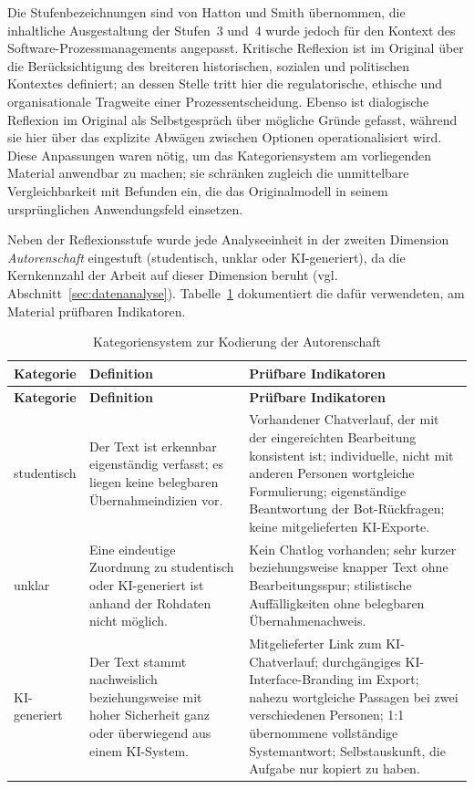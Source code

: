 Die Stufenbezeichnungen sind von Hatton und Smith \cite{hattonSmithReflectionTeacherEducation1995}
übernommen, die inhaltliche Ausgestaltung der Stufen~3 und~4 wurde jedoch für den Kontext des
Software-Prozessmanagements angepasst. Kritische Reflexion ist im Original über die Berücksichtigung
des breiteren historischen, sozialen und politischen Kontextes definiert; an dessen Stelle tritt hier
die regulatorische, ethische und organisationale Tragweite einer Prozessentscheidung. Ebenso ist
dialogische Reflexion im Original als Selbstgespräch über mögliche Gründe gefasst, während sie hier
über das explizite Abwägen zwischen Optionen operationalisiert wird. Diese Anpassungen waren nötig,
um das Kategoriensystem am vorliegenden Material anwendbar zu machen; sie schränken zugleich die
unmittelbare Vergleichbarkeit mit Befunden ein, die das Originalmodell in seinem ursprünglichen
Anwendungsfeld einsetzen.

Neben der Reflexionsstufe wurde jede Analyseeinheit in der zweiten Dimension \emph{Autorenschaft}
eingestuft (studentisch, unklar oder KI-generiert), da die Kernkennzahl der Arbeit auf dieser
Dimension beruht (vgl. Abschnitt~\ref{sec:datenanalyse}). Tabelle~\ref{tab:autorenschaft}
dokumentiert die dafür verwendeten, am Material prüfbaren Indikatoren.

\begingroup
\setlength{\tabcolsep}{4pt}
\begin{longtable}{p{2.6cm} p{5.2cm} p{5.2cm}}
	\caption{Kategoriensystem zur Kodierung der Autorenschaft}
	\label{tab:autorenschaft} \\
	\toprule
	\textbf{Kategorie} & \textbf{Definition} & \textbf{Prüfbare Indikatoren} \\
	\midrule
	\endfirsthead
	\toprule
	\textbf{Kategorie} & \textbf{Definition} & \textbf{Prüfbare Indikatoren} \\
	\midrule
	\endhead
	\bottomrule
	\endfoot
	studentisch &
	Der Text ist erkennbar eigenständig verfasst; es liegen keine belegbaren Übernahmeindizien vor. &
	Vorhandener Chatverlauf, der mit der eingereichten Bearbeitung konsistent ist; individuelle, nicht
	mit anderen Personen wortgleiche Formulierung; eigenständige Beantwortung der Bot-Rückfragen; keine
	mitgelieferten KI-Exporte. \\
	unklar &
	Eine eindeutige Zuordnung zu studentisch oder KI-generiert ist anhand der Rohdaten nicht möglich. &
	Kein Chatlog vorhanden; sehr kurzer beziehungsweise knapper Text ohne Bearbeitungsspur;
	stilistische Auffälligkeiten ohne belegbaren Übernahmenachweis. \\
	KI-generiert &
	Der Text stammt nachweislich beziehungsweise mit hoher Sicherheit ganz oder überwiegend aus einem
	KI-System. &
	Mitgelieferter Link zum KI-Chatverlauf; durchgängiges KI-Interface-Branding im Export; nahezu
	wortgleiche Passagen bei zwei verschiedenen Personen; 1:1 übernommene vollständige Systemantwort;
	Selbstauskunft, die Aufgabe nur kopiert zu haben. \\
\end{longtable}
\endgroup

